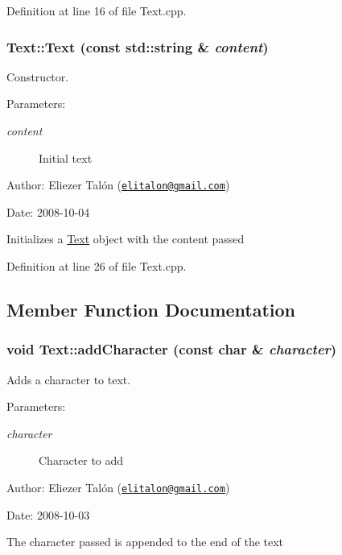 Definition at line 16 of file Text.cpp.\hypertarget{class_text_d8c7b52db022f4351e31b2b7609a8180}{
\subsubsection[Text]{\setlength{\rightskip}{0pt plus 5cm}Text::Text (const std::string \& {\em content})}}
\label{class_text_d8c7b52db022f4351e31b2b7609a8180}


Constructor. 

\begin{Desc}
\item[Parameters:]
\begin{description}
\item[{\em content}]Initial text\end{description}
\end{Desc}
\begin{Desc}
\item[Author:]Eliezer Talón (\href{mailto:elitalon@gmail.com}{\tt elitalon@gmail.com}) \end{Desc}
\begin{Desc}
\item[Date:]2008-10-04\end{Desc}
Initializes a \hyperlink{class_text}{Text} object with the content passed 

Definition at line 26 of file Text.cpp.

\subsection{Member Function Documentation}
\hypertarget{class_text_6e6da63c90af68639adc7dd1336f6bf9}{
\subsubsection[addCharacter]{\setlength{\rightskip}{0pt plus 5cm}void Text::addCharacter (const char \& {\em character})}}
\label{class_text_6e6da63c90af68639adc7dd1336f6bf9}


Adds a character to text. 

\begin{Desc}
\item[Parameters:]
\begin{description}
\item[{\em character}]Character to add\end{description}
\end{Desc}
\begin{Desc}
\item[Author:]Eliezer Talón (\href{mailto:elitalon@gmail.com}{\tt elitalon@gmail.com}) \end{Desc}
\begin{Desc}
\item[Date:]2008-10-03\end{Desc}
The character passed is appended to the end of the text 

